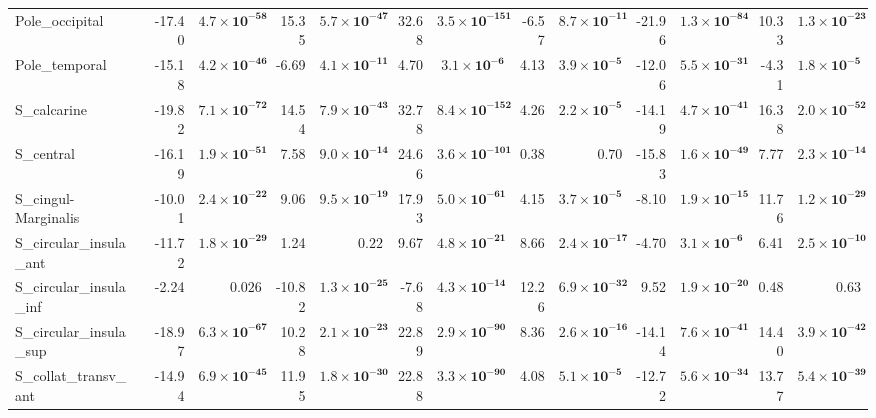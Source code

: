 {\begin{longtable}{llrrrrrrrrrrrr}
Pole\_occipital &  & -17.40 & $\mathbf{4.7{\times}10^{-58}}$ & 15.35 & $\mathbf{5.7{\times}10^{-47}}$ & 32.68 & $\mathbf{3.5{\times}10^{-151}}$ & -6.57 & $\mathbf{8.7{\times}10^{-11}}$ & -21.96 & $\mathbf{1.3{\times}10^{-84}}$ & 10.33 & $\mathbf{1.3{\times}10^{-23}}$ \\
Pole\_temporal &  & -15.18 & $\mathbf{4.2{\times}10^{-46}}$ & -6.69 & $\mathbf{4.1{\times}10^{-11}}$ & 4.70 & $\mathbf{3.1{\times}10^{-6}}$ & 4.13 & $\mathbf{3.9{\times}10^{-5}}$ & -12.06 & $\mathbf{5.5{\times}10^{-31}}$ & -4.31 & $\mathbf{1.8{\times}10^{-5}}$ \\
S\_calcarine &  & -19.82 & $\mathbf{7.1{\times}10^{-72}}$ & 14.54 & $\mathbf{7.9{\times}10^{-43}}$ & 32.78 & $\mathbf{8.4{\times}10^{-152}}$ & 4.26 & $\mathbf{2.2{\times}10^{-5}}$ & -14.19 & $\mathbf{4.7{\times}10^{-41}}$ & 16.38 & $\mathbf{2.0{\times}10^{-52}}$ \\
S\_central &  & -16.19 & $\mathbf{1.9{\times}10^{-51}}$ & 7.58 & $\mathbf{9.0{\times}10^{-14}}$ & 24.66 & $\mathbf{3.6{\times}10^{-101}}$ & 0.38 & $0.70$ & -15.83 & $\mathbf{1.6{\times}10^{-49}}$ & 7.77 & $\mathbf{2.3{\times}10^{-14}}$ \\
S\_cingul-Marginalis &  & -10.01 & $\mathbf{2.4{\times}10^{-22}}$ & 9.06 & $\mathbf{9.5{\times}10^{-19}}$ & 17.93 & $\mathbf{5.0{\times}10^{-61}}$ & 4.15 & $\mathbf{3.7{\times}10^{-5}}$ & -8.10 & $\mathbf{1.9{\times}10^{-15}}$ & 11.76 & $\mathbf{1.2{\times}10^{-29}}$ \\
S\_circular\_insula\_ant &  & -11.72 & $\mathbf{1.8{\times}10^{-29}}$ & 1.24 & $0.22$ & 9.67 & $\mathbf{4.8{\times}10^{-21}}$ & 8.66 & $\mathbf{2.4{\times}10^{-17}}$ & -4.70 & $\mathbf{3.1{\times}10^{-6}}$ & 6.41 & $\mathbf{2.5{\times}10^{-10}}$ \\
S\_circular\_insula\_inf &  & -2.24 & $0.026$ & -10.82 & $\mathbf{1.3{\times}10^{-25}}$ & -7.68 & $\mathbf{4.3{\times}10^{-14}}$ & 12.26 & $\mathbf{6.9{\times}10^{-32}}$ & 9.52 & $\mathbf{1.9{\times}10^{-20}}$ & 0.48 & $0.63$ \\
S\_circular\_insula\_sup &  & -18.97 & $\mathbf{6.3{\times}10^{-67}}$ & 10.28 & $\mathbf{2.1{\times}10^{-23}}$ & 22.89 & $\mathbf{2.9{\times}10^{-90}}$ & 8.36 & $\mathbf{2.6{\times}10^{-16}}$ & -14.14 & $\mathbf{7.6{\times}10^{-41}}$ & 14.40 & $\mathbf{3.9{\times}10^{-42}}$ \\
S\_collat\_transv\_ant &  & -14.94 & $\mathbf{6.9{\times}10^{-45}}$ & 11.95 & $\mathbf{1.8{\times}10^{-30}}$ & 22.88 & $\mathbf{3.3{\times}10^{-90}}$ & 4.08 & $\mathbf{5.1{\times}10^{-5}}$ & -12.72 & $\mathbf{5.6{\times}10^{-34}}$ & 13.77 & $\mathbf{5.4{\times}10^{-39}}$ \\

\end{longtable}}
